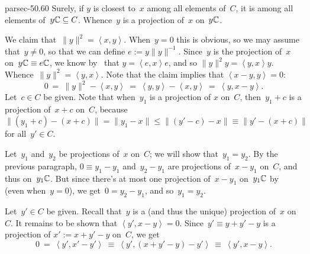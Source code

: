 \documentclass[b5page]{book}
\begin{document}
\begin{solution}{parsec-50.60}%
Surely, if $y$ is closest to~$x$
among all elements of~$C$,
it is among all elements of~$y\mathbb{C}\subseteq C$.
Whence~$y$ is a projection of~$x$ on~$y\mathbb{C}$.

We claim that~$\|y\|^2 = \left<x,y\right>$.  When~$y=0$
    this is obvious, so we may assume that~$y\neq 0$,
    so that we can define $e:= y\|y\|^{-1}$.
Since~$y$ is the projection of~$x$ on~$y\mathbb{C}\equiv e\mathbb{C}$,
we know by~ that
$y=\left<e,x\right>e$,
and so $\|y\|^2 y = \left<y,x\right>y$.
Whence~$\|y\|^2 = \left<y,x\right>$.
Note that the claim implies that $\left<x-y,y\right>=0$:
\begin{equation*}
0\ =\ \|y\|^2-\left<x,y\right> \ =\  \left<y,y\right>-\left<x,y\right>
\ =\  \left<y,x-y\right>.
\end{equation*}
Let~$c\in C$ be given.
Note that when~$y_1$ is a projection of
    $x$ on~$C$, then~$y_1+c$ is a projection
of~$x+c$ on~$C$, because
    $\|(y_1+c)-(x+c)\|=\|y_1-x\|\leq \|(y'-c)-x\|\equiv \|y'-(x+c)\|$
    for all~$y'\in C$.

Let~$y_1$ and~$y_2$ be projections of~$x$ on~$C$;
we will show that~$y_1=y_2$.
By the previous paragraph,
$0\equiv y_1-y_1$ and~$y_2-y_1$ are projections of~$x-y_1$ on~$C$,
and thus on~$y_1\mathbb{C}$.
But since there's at most one projection of~$x-y_1$ on~$y_1\mathbb{C}$
    by~ (even when~$y=0$),
    we get~$0=y_2-y_1$, and so~$y_1=y_2$.

Let~$y'\in C$ be given.
Recall that~$y$ is a (and thus the unique) projection of~$x$
on~$C$. It remains to be shown that
$\left<y',x-y\right>=0$.
Since~$y' \equiv y+y'-y$ is a projection
of $x':=x+y'-y$ on~$C$,
    we get 
\begin{equation*}
0\ =\ \left<y',x'-y'\right>\ \equiv \ 
    \left<y',(x+y'-y)-y'\right>\ \equiv\  \left<y',x-y\right>.
\end{equation*}
\end{solution}
\end{document}
